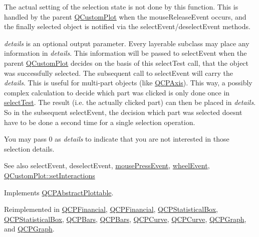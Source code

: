 The actual setting of the selection state is not done by this function. This is handled by the parent \hyperlink{class_q_custom_plot}{Q\+Custom\+Plot} when the mouse\+Release\+Event occurs, and the finally selected object is notified via the select\+Event/deselect\+Event methods.

{\itshape details} is an optional output parameter. Every layerable subclass may place any information in {\itshape details}. This information will be passed to select\+Event when the parent \hyperlink{class_q_custom_plot}{Q\+Custom\+Plot} decides on the basis of this select\+Test call, that the object was successfully selected. The subsequent call to select\+Event will carry the {\itshape details}. This is useful for multi-\/part objects (like \hyperlink{class_q_c_p_axis}{Q\+C\+P\+Axis}). This way, a possibly complex calculation to decide which part was clicked is only done once in \hyperlink{class_q_c_p_abstract_plottable1_d_a6c74e8da051e0e6b763a4be2cb139e8e}{select\+Test}. The result (i.\+e. the actually clicked part) can then be placed in {\itshape details}. So in the subsequent select\+Event, the decision which part was selected doesn\textquotesingle{}t have to be done a second time for a single selection operation.

You may pass 0 as {\itshape details} to indicate that you are not interested in those selection details.

\begin{DoxySeeAlso}{See also}
select\+Event, deselect\+Event, \hyperlink{class_q_c_p_layerable_af6567604818db90f4fd52822f8bc8376}{mouse\+Press\+Event}, \hyperlink{class_q_c_p_layerable_a47dfd7b8fd99c08ca54e09c362b6f022}{wheel\+Event}, \hyperlink{class_q_custom_plot_a5ee1e2f6ae27419deca53e75907c27e5}{Q\+Custom\+Plot\+::set\+Interactions} 
\end{DoxySeeAlso}


Implements \hyperlink{class_q_c_p_abstract_plottable_a38efe9641d972992a3d44204bc80ec1d}{Q\+C\+P\+Abstract\+Plottable}.



Reimplemented in \hyperlink{class_q_c_p_financial_aac8e91622ac58330fa9ce81cc8fd40ee}{Q\+C\+P\+Financial}, \hyperlink{class_q_c_p_financial_a6067c625621b07a85a6989a0a4b8d309}{Q\+C\+P\+Financial}, \hyperlink{class_q_c_p_statistical_box_a1607fa92f829c631107c20ccb2d70a6d}{Q\+C\+P\+Statistical\+Box}, \hyperlink{class_q_c_p_statistical_box_ae78bfe096f463a8d08464c20cc25defe}{Q\+C\+P\+Statistical\+Box}, \hyperlink{class_q_c_p_bars_a121f899c27af3186fe93dcd0eb98f49b}{Q\+C\+P\+Bars}, \hyperlink{class_q_c_p_bars_a7b282a2932c7c0b4a45bd61e8c490153}{Q\+C\+P\+Bars}, \hyperlink{class_q_c_p_curve_a0ed9b7e6b4bc72010d6fcd974af46a8b}{Q\+C\+P\+Curve}, \hyperlink{class_q_c_p_curve_a0b3f4916f33b692508a6a1292b46880e}{Q\+C\+P\+Curve}, \hyperlink{class_q_c_p_graph_a6d669d04462d272c6aa0e5f85846d673}{Q\+C\+P\+Graph}, and \hyperlink{class_q_c_p_graph_ab70a737dabcedbd4da4a0bc5a9cff60e}{Q\+C\+P\+Graph}.

